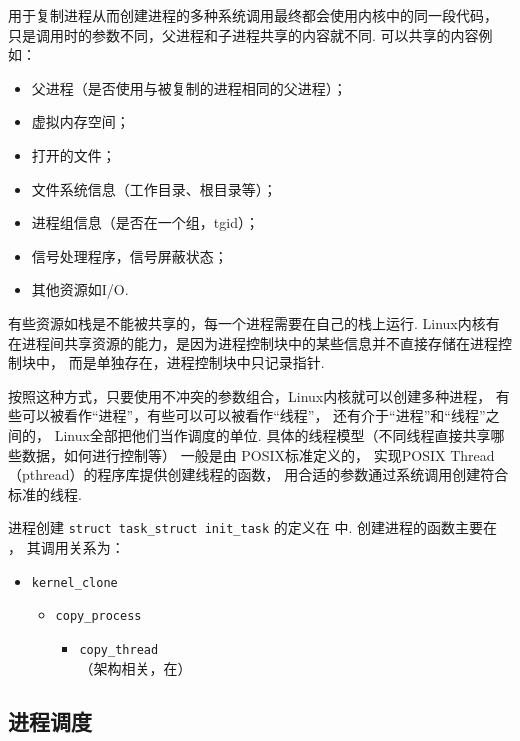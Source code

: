 用于复制进程从而创建进程的多种系统调用最终都会使用内核中的同一段代码，
只是调用时的参数不同，父进程和子进程共享的内容就不同.
可以共享的内容例如：
\begin{itemize}
	\item 父进程（是否使用与被复制的进程相同的父进程）；
	\item 虚拟内存空间；
	\item 打开的文件；
	\item 文件系统信息（工作目录、根目录等）；
	\item 进程组信息（是否在一个组，tgid）；
	\item 信号处理程序，信号屏蔽状态；
	\item 其他资源如I/O.
\end{itemize}
有些资源如栈是不能被共享的，每一个进程需要在自己的栈上运行.
Linux内核有在进程间共享资源的能力，是因为进程控制块中的某些信息并不直接存储在进程控制块中，
而是单独存在，进程控制块中只记录指针.\cite{silberschatz2021operating}

按照这种方式，只要使用不冲突的参数组合，Linux内核就可以创建多种进程，
有些可以被看作“进程”，有些可以可以被看作“线程”，
还有介于“进程”和“线程”之间的，
Linux全部把他们当作调度的单位.
具体的线程模型（不同线程直接共享哪些数据，如何进行控制等）
一般是由 POSIX标准\cite{pthread}定义的，
实现POSIX Thread （pthread）的程序库提供创建线程的函数，
用合适的参数通过系统调用创建符合标准的线程.

\begin{readsrcbox}{进程创建}
	\lstinline{struct task_struct init_task}
	的定义在  中.
	创建进程的函数主要在 ，
	其调用关系为：
	\begin{itemize}
		\item \lstinline{kernel_clone}
		      \begin{itemize}
			      \item \lstinline{copy_process}
			            \begin{itemize}
				            \item \lstinline{copy_thread} \\
				                  （架构相关，在）
			            \end{itemize}
		      \end{itemize}
	\end{itemize}
\end{readsrcbox}

\subsection{进程调度} \label{scheduling} 
